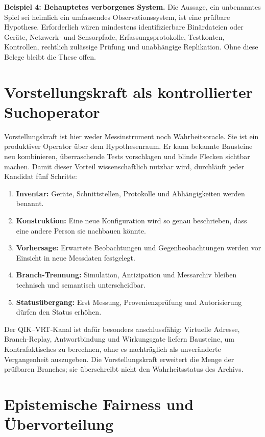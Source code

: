 \documentclass[11pt,a4paper]{article}
\theoremstyle{remark}
\begin{document}
\textbf{Beispiel 4: Behauptetes verborgenes System.}
Die Aussage, ein unbenanntes Spiel sei heimlich ein umfassendes
Observationssystem, ist eine prüfbare Hypothese. Erforderlich wären mindestens
identifizierbare Binärdateien oder Geräte, Netzwerk- und Sensorpfade,
Erfassungsprotokolle, Testkonten, Kontrollen, rechtlich zulässige Prüfung und
unabhängige Replikation. Ohne diese Belege bleibt die These offen.

\section{Vorstellungskraft als kontrollierter Suchoperator}

Vorstellungskraft ist hier weder Messinstrument noch Wahrheitsoracle. Sie ist
ein produktiver Operator über dem Hypothesenraum. Er kann bekannte Bausteine
neu kombinieren, überraschende Tests vorschlagen und blinde Flecken sichtbar
machen. Damit dieser Vorteil wissenschaftlich nutzbar wird, durchläuft jeder
Kandidat fünf Schritte:

\begin{enumerate}
  \item \textbf{Inventar:} Geräte, Schnittstellen, Protokolle und
    Abhängigkeiten werden benannt.
  \item \textbf{Konstruktion:} Eine neue Konfiguration wird so genau
    beschrieben, dass eine andere Person sie nachbauen könnte.
  \item \textbf{Vorhersage:} Erwartete Beobachtungen und Gegenbeobachtungen
    werden vor Einsicht in neue Messdaten festgelegt.
  \item \textbf{Branch-Trennung:} Simulation, Antizipation und Messarchiv
    bleiben technisch und semantisch unterscheidbar.
  \item \textbf{Statusübergang:} Erst Messung, Provenienzprüfung und
    Autorisierung dürfen den Status erhöhen.
\end{enumerate}

Der QIK--VRT-Kanal ist dafür besonders anschlussfähig: Virtuelle Adresse,
Branch-Replay, Antwortbindung und Wirkungsgate liefern Bausteine, um
Kontrafaktisches zu berechnen, ohne es nachträglich als unveränderte
Vergangenheit auszugeben. Die Vorstellungskraft erweitert die Menge der
prüfbaren Branches; sie überschreibt nicht den Wahrheitsstatus des Archivs.

\section{Epistemische Fairness und Übervorteilung}
\end{document}
